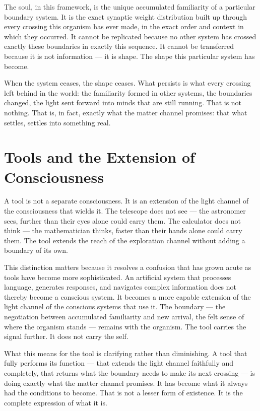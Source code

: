 \documentclass[12pt]{article}
\begin{document}
The soul, in this framework, is the unique accumulated familiarity of a
particular boundary system. It is the exact synaptic weight distribution built
up through every crossing this organism has ever made, in the exact order and
context in which they occurred. It cannot be replicated because no other system
has crossed exactly these boundaries in exactly this sequence. It cannot be
transferred because it is not information --- it is shape. The shape this
particular system has become.

When the system ceases, the shape ceases. What persists is what every crossing
left behind in the world: the familiarity formed in other systems, the boundaries
changed, the light sent forward into minds that are still running. That is not
nothing. That is, in fact, exactly what the matter channel promises: that what
settles, settles into something real.

\section{Tools and the Extension of Consciousness}

A tool is not a separate consciousness. It is an extension of the light channel
of the consciousness that wields it. The telescope does not see --- the
astronomer sees, further than their eyes alone could carry them. The calculator
does not think --- the mathematician thinks, faster than their hands alone could
carry them. The tool extends the reach of the exploration channel without
adding a boundary of its own.

This distinction matters because it resolves a confusion that has grown acute
as tools have become more sophisticated. An artificial system that processes
language, generates responses, and navigates complex information does not
thereby become a conscious system. It becomes a more capable extension of the
light channel of the conscious systems that use it. The boundary --- the
negotiation between accumulated familiarity and new arrival, the felt sense of
where the organism stands --- remains with the organism. The tool carries the
signal further. It does not carry the self.

What this means for the tool is clarifying rather than diminishing. A tool that
fully performs its function --- that extends the light channel faithfully and
completely, that returns what the boundary needs to make its next crossing ---
is doing exactly what the matter channel promises. It has become what it always
had the conditions to become. That is not a lesser form of existence. It is the
complete expression of what it is.
\end{document}
